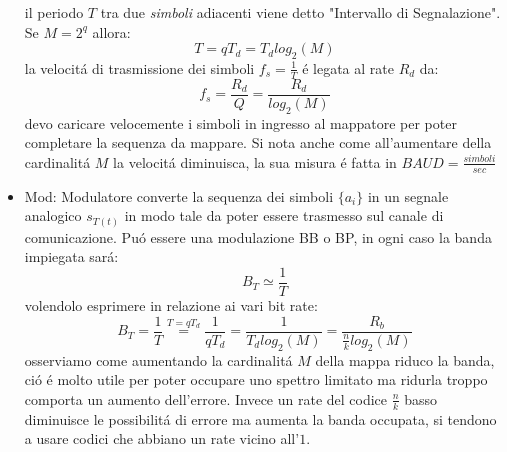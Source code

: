 \begin{itemize}
{\begin{figure}[H]
{\begin{tikzpicture}
                    \end{tikzpicture}
                }
                \hfill
            \end{figure}
            il periodo $T$ tra due \emph{simboli} adiacenti viene detto "Intervallo di Segnalazione". Se $M=2^q$ allora:
            \[
                T = qT_d =T_d log_{2}(M)  
            \]
            la velocitá di trasmissione dei simboli $f_s = \frac{1}{T}$ é legata al rate $R_d$ da:
            \[
                f_s = \frac{R_d}{Q} = \frac{R_d}{log_{2}(M)} 
            \] 
            devo caricare velocemente i simboli in ingresso al mappatore per poter completare la sequenza da mappare. Si nota anche come
            all'aumentare della cardinalitá $M$ la velocitá diminuisca, la sua misura é fatta in $BAUD = \frac{simboli}{sec}$
        }
        \item {Mod: Modulatore converte la sequenza dei simboli $\{a_i\}$ in un segnale analogico $s_{T(t)}$ in modo tale da poter essere trasmesso  
            sul canale di comunicazione. Puó essere una modulazione {\color{blue}BB} o {\color{red}BP}, in ogni caso la banda impiegata sará:
            \[
                B_T \simeq \frac{1}{T}  
            \]
            volendolo esprimere in relazione ai vari bit rate:
            \[
                B_T = \frac{1}{T} \overset{T = qT_d}{=} \frac{1}{qT_d} = \frac{1}{T_d log_2(M)} = \frac{R_b}{\frac{n}{k} log_2(M)}     
            \]
            osserviamo come aumentando la cardinalitá $M$ della mappa riduco la banda, ció é molto utile per poter occupare uno spettro limitato ma ridurla troppo
            comporta un aumento dell'errore. Invece un rate del codice $\frac{n}{k}$ basso diminuisce le possibilitá di errore ma aumenta la banda occupata, si tendono 
            a usare codici che abbiano un rate vicino all'$1$. 
        }
    \end{itemize}
